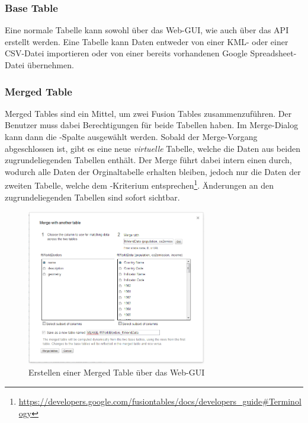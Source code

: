 \subsubsection{Base Table}
Eine normale Tabelle kann sowohl über das Web-GUI, wie auch über das \gls{API} erstellt werden. Eine Tabelle kann Daten entweder von einer \gls{KML}- oder einer \gls{CSV}-Datei importieren oder von einer bereits vorhandenen Google Spreadsheet-Datei übernehmen.

\subsubsection{Merged Table}
\label{merge-table}
Merged Tables sind ein Mittel, um zwei Fusion Tables zusammenzuführen. Der Benutzer muss dabei Berechtigungen für beide Tabellen haben. Im \gls{Merge}-Dialog kann dann die -Spalte ausgewählt werden. Sobald der \gls{Merge}-Vorgang abgeschlossen ist, gibt es eine neue \emph{virtuelle} Tabelle, welche die Daten aus beiden zugrundeliegenden Tabellen enthält. Der \gls{Merge} führt dabei intern einen  durch, wodurch alle Daten der Orginaltabelle erhalten bleiben, jedoch nur die Daten der zweiten Tabelle, welche dem -Kriterium entsprechen\footnote{ \url{https://developers.google.com/fusiontables/docs/developers_guide\#Terminology}}. Änderungen an den zugrundeliegenden Tabellen sind sofort sichtbar.

\begin{figure}[!ht]
	\centering
	\includegraphics[width=0.7\textwidth]{images/usecase1-worlddata/documentation/worlddata-merge2}
	\caption{Erstellen einer Merged Table über das Web-GUI}
	\label{create-merge-table}
\end{figure}


